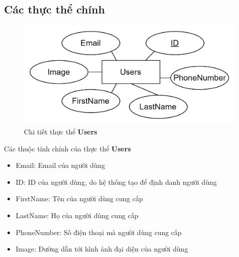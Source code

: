 \subsection{Các thực thể chính}
\begin{figure}[h]
    \centering
    \includegraphics[scale = 0.20]{img/db/users.png}
    \vspace{1cm}
    \caption{Chi tiết thực thể \textbf{Users}}
    \label{fig:taskAssignment}
\end{figure}
Các thuộc tính chính của thực thể \textbf{Users}
\begin{itemize}
    \item Email: Email của người dùng
    \item ID: ID của người dùng, do hệ thống tạo để định danh người dùng
    \item FirstName: Tên của người dùng cung cấp
    \item LastName: Họ của người dùng cung cấp
    \item PhoneNumber: Số điện thoại mà người dùng cung cấp
    \item Image: Đường dẫn tới hình ảnh đại diện của người dùng
\end{itemize}

